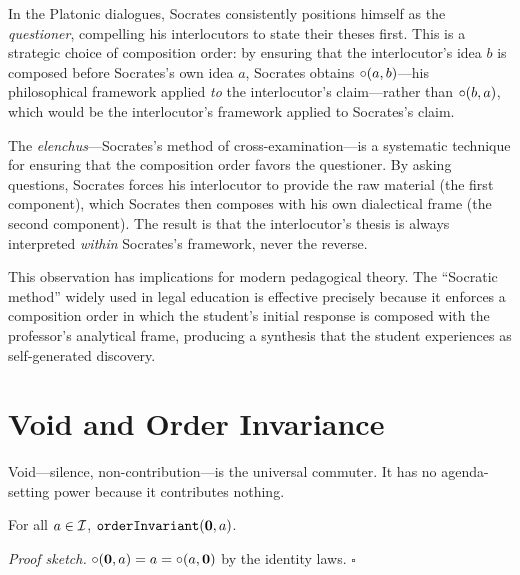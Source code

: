 \begin{example}
\label{ex:socratic}
In the Platonic dialogues, Socrates consistently positions himself as the
\emph{questioner}, compelling his interlocutors to state their theses
first.  This is a strategic choice of composition order: by ensuring that
the interlocutor's idea $b$ is composed before Socrates's own idea $a$,
Socrates obtains $\circ(a, b)$---his philosophical framework applied
\emph{to} the interlocutor's claim---rather than $\circ(b, a)$, which
would be the interlocutor's framework applied to Socrates's claim.

The \emph{elenchus}---Socrates's method of cross-examination---is a
systematic technique for ensuring that the composition order favors the
questioner.  By asking questions, Socrates forces his interlocutor to
provide the raw material (the first component), which Socrates then
composes with his own dialectical frame (the second component).  The result
is that the interlocutor's thesis is always interpreted \emph{within}
Socrates's framework, never the reverse.

This observation has implications for modern pedagogical theory.  The
``Socratic method'' widely used in legal education is effective precisely
because it enforces a composition order in which the student's initial
response is composed with the professor's analytical frame, producing a
synthesis that the student experiences as self-generated discovery.
\end{example}

\section{Void and Order Invariance}
\label{sec:ch17-void}

Void---silence, non-contribution---is the universal commuter.  It has no
agenda-setting power because it contributes nothing.

\begin{theorem}
\label{thm:void_order_invariant}
For all $a \in \mathcal{I}$, $\texttt{orderInvariant}(\mathbf{0}, a)$.
\end{theorem}

\noindent\textit{Proof sketch.}\quad
$\circ(\mathbf{0}, a) = a = \circ(a, \mathbf{0})$ by the identity laws.
\hfill$\square$

\medskip

